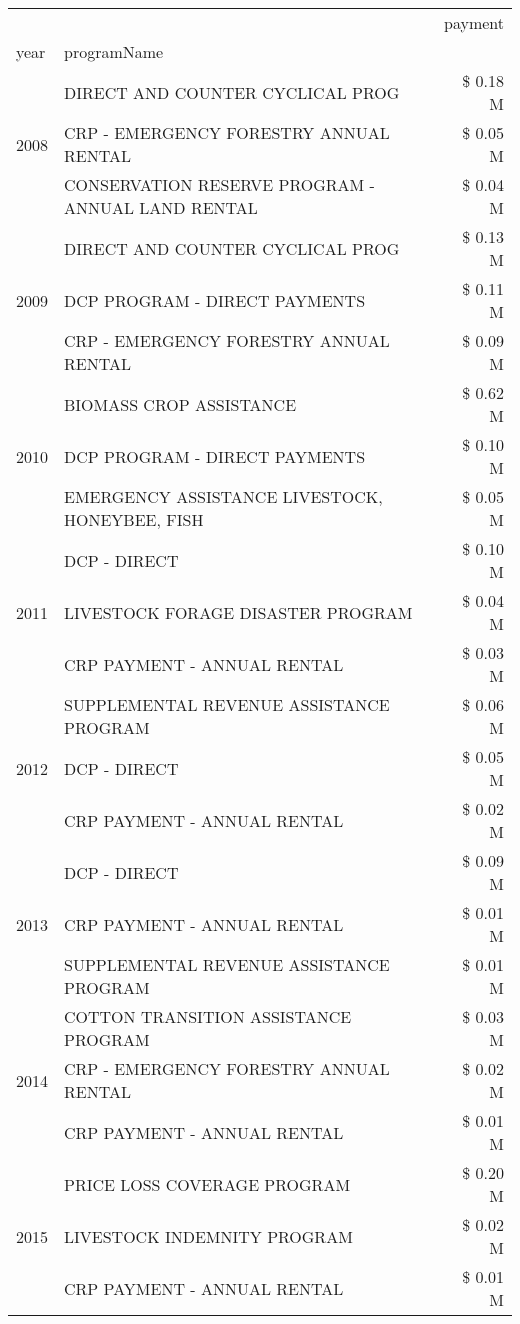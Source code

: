 \begin{tabular}{llr}
\toprule
 &  & payment \\
year & programName &  \\
\midrule
\multirow[t]{3}{*}{2008} & DIRECT AND COUNTER CYCLICAL PROG & \$ 0.18 M \\
 & CRP - EMERGENCY FORESTRY ANNUAL RENTAL & \$ 0.05 M \\
 & CONSERVATION RESERVE PROGRAM - ANNUAL LAND RENTAL & \$ 0.04 M \\
\cline{1-3}
\multirow[t]{3}{*}{2009} & DIRECT AND COUNTER CYCLICAL PROG & \$ 0.13 M \\
 & DCP PROGRAM - DIRECT PAYMENTS & \$ 0.11 M \\
 & CRP - EMERGENCY FORESTRY ANNUAL RENTAL & \$ 0.09 M \\
\cline{1-3}
\multirow[t]{3}{*}{2010} & BIOMASS CROP ASSISTANCE & \$ 0.62 M \\
 & DCP PROGRAM - DIRECT PAYMENTS & \$ 0.10 M \\
 & EMERGENCY ASSISTANCE LIVESTOCK, HONEYBEE, FISH & \$ 0.05 M \\
\cline{1-3}
\multirow[t]{3}{*}{2011} & DCP - DIRECT & \$ 0.10 M \\
 & LIVESTOCK FORAGE DISASTER PROGRAM & \$ 0.04 M \\
 & CRP PAYMENT - ANNUAL RENTAL & \$ 0.03 M \\
\cline{1-3}
\multirow[t]{3}{*}{2012} & SUPPLEMENTAL REVENUE ASSISTANCE PROGRAM & \$ 0.06 M \\
 & DCP - DIRECT & \$ 0.05 M \\
 & CRP PAYMENT - ANNUAL RENTAL & \$ 0.02 M \\
\cline{1-3}
\multirow[t]{3}{*}{2013} & DCP - DIRECT & \$ 0.09 M \\
 & CRP PAYMENT - ANNUAL RENTAL & \$ 0.01 M \\
 & SUPPLEMENTAL REVENUE ASSISTANCE PROGRAM & \$ 0.01 M \\
\cline{1-3}
\multirow[t]{3}{*}{2014} & COTTON TRANSITION ASSISTANCE PROGRAM & \$ 0.03 M \\
 & CRP - EMERGENCY FORESTRY ANNUAL RENTAL & \$ 0.02 M \\
 & CRP PAYMENT - ANNUAL RENTAL & \$ 0.01 M \\
\cline{1-3}
\multirow[t]{3}{*}{2015} & PRICE LOSS COVERAGE PROGRAM & \$ 0.20 M \\
 & LIVESTOCK INDEMNITY PROGRAM & \$ 0.02 M \\
 & CRP PAYMENT - ANNUAL RENTAL & \$ 0.01 M \\

\end{tabular}
